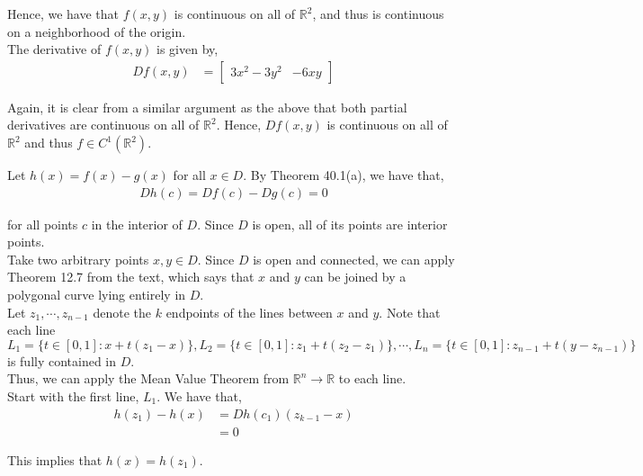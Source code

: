 \documentclass[12pt]{article}
\newenvironment{problem}[2][Problem]{\begin{trivlist}
\item[\hskip \labelsep {\bfseries #1}\hskip \labelsep {\bfseries #2.}]}{\end{trivlist}}
\begin{document}
Hence, we have that $f(x, y)$ is continuous on all of $\mathbb{R}^2$, and thus is continuous on a neighborhood of the origin.\\

The derivative of $f(x,y)$ is given by,
\begin{align*}
Df(x,y) &= \begin{bmatrix}
3x^2 - 3y^2 & -6xy
\end{bmatrix}
\end{align*}

Again, it is clear from a similar argument as the above that both partial derivatives are continuous on all of $\mathbb{R}^2$. Hence, $Df(x,y)$ is continuous on all of $\mathbb{R}^2$ and thus $f \in C^1(\mathbb{R}^2)$.

\begin{problem}{5}
\end{problem}

Let $h(x) = f(x) - g(x)$ for all $x \in D$. By Theorem 40.1(a), we have that,
\begin{align*}
Dh(c) = Df(c) - Dg(c) = 0
\end{align*}

for all points $c$ in the interior of $D$. Since $D$ is open, all of its points are interior points.\\

Take two arbitrary points $x, y \in D$. Since $D$ is open and connected, we can apply Theorem 12.7 from the text, which says that $x$ and $y$ can be joined by a polygonal curve lying entirely in $D$.\\

Let $z_1, \cdots, z_{n-1}$ denote the $k$ endpoints of the lines between $x$ and $y$. Note that each line $L_1 = \{t \in [0,1]: x + t(z_1 - x)\}, L_2 = \{t \in [0,1]: z_1 + t(z_2 - z_1)\}, \cdots, L_n = \{t \in [0,1]: z_{n-1} + t(y - z_{n-1})\}$ is fully contained in $D$.\\

Thus, we can apply the Mean Value Theorem from $\mathbb{R}^n \to \mathbb{R}$ to each line.\\

Start with the first line, $L_1$. We have that,
\begin{align*}
h(z_1) - h(x) &= Dh(c_1)(z_{k-1} - x)\\
&= 0
\end{align*}

This implies that $h(x) = h(z_1)$.\\
\end{document}
